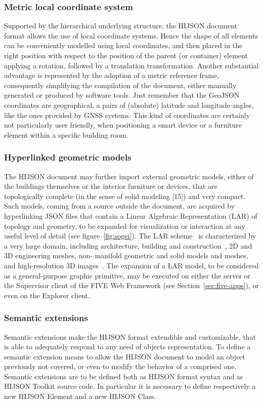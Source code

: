 \documentclass[]{egpubl}
\begin{document}
\subsubsection*{Metric local coordinate system}

Supported by the hierarchical underlying structure, the HIJSON document format
allows the use of local coordinate systems. Hence the shape of all elements
can be conveniently modelled using local coordinates, and then placed in the
right position with respect to the position of the parent (or container)
element applying a rotation, followed by a translation transformation. Another
substantial advantage is represented by the adoption of a metric reference
frame, consequently simplifying the compilation of the document, either
manually generated or produced by software tools. Just remember that the
GeoJSON coordinates are geographical, a pairs of (absolute) latitude and
longitude angles, like the ones provided by GNSS systems. This kind of
coordinates are certainly not particularly user friendly, when positioning a
smart device or a furniture element within a specific building room.

\subsubsection*{Hyperlinked geometric models}

The HIJSON document may further import external geometric models, either of
the buildings themselves or the interior furniture or devices, that are
topologically complete (in the sense of solid modeling [15]) and very compact.
Such models, coming from a source outside the document, are acquired by
hyperlinking JSON files that contain a Linear Algebraic Representation (LAR)
of topology and geometry, to be expanded for visualization or interaction at
any useful level of detail (see figure~\ref{fig:sogei}). The LAR
scheme~\cite{Dicarlo:2014:TNL:2543138.2543294} is characterized by a very
large domain, including architecture, building and
construction~\cite{paoluzziMS:2014}, 2D and 3D engineering meshes, non-
manifold geometric and solid models and meshes, and high-resolution 3D
images~\cite{cadanda:2015}.  The expansion of a LAR model, to be considered as
a general-purpose graphic primitive, may be executed on either the server or
the Supervisor client of the FIVE Web Framework (see Section~\ref{sec:five-apps}),
or even on the Explorer client.


\subsubsection*{Semantic extensions} Semantic extensions make the HIJSON format
extendible and customizable, that is able to adequately respond to any need of
objects representation. To define a semantic extension means to allow the
HIJSON document to model an object previously not covered, or even to modify
the behavior of a comprised one. Semantic extensions are to be defined both as
HIJSON format syntax and as HIJSON Toolkit source code. In particular it is
necessary to define respectively a new HIJSON Element and a new HIJSON Class.
\end{document}
